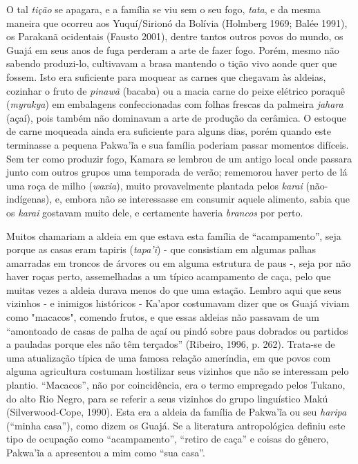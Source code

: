 O tal \emph{tição} se apagara, e a família se viu sem o seu fogo,
\emph{tata}, e da mesma maneira que ocorreu aos Yuquí/Sirionó da Bolívia
(Holmberg 1969; Balée 1991), os Parakanã ocidentais (Fausto 2001),
dentre tantos outros povos do mundo, os Guajá em seus anos de fuga
perderam a arte de fazer fogo. Porém, mesmo não sabendo produzi-lo,
cultivavam a brasa mantendo o tição vivo aonde quer que fossem. Isto era
suficiente para moquear as carnes que chegavam às aldeias, cozinhar o
fruto de \emph{pinawã} (bacaba) ou a macia carne do peixe elétrico
poraquê (\emph{myrakya}) em embalagens confeccionadas com folhas frescas
da palmeira \emph{jahara} (açaí), pois também não dominavam a arte de
produção da cerâmica. O estoque de carne moqueada ainda era suficiente
para alguns dias, porém quando este terminasse a pequena Pakwa'ĩa e sua
família poderiam passar momentos difíceis. Sem ter como produzir fogo,
Kamara se lembrou de um antigo local onde passara junto com outros
grupos uma temporada de verão; rememorou haver perto de lá uma roça de
milho (\emph{waxia}), muito provavelmente plantada pelos \emph{karai}
(não-indígenas), e, embora não se interessasse em consumir aquele
alimento, sabia que os \emph{karai} gostavam muito dele, e certamente
haveria \emph{brancos} por perto.

Muitos chamariam a aldeia em que estava esta família de ``acampamento'',
seja porque as casas eram tapiris (\emph{tapa'ĩ}) - que consistiam em
algumas palhas amarradas em troncos de árvores ou em alguma estrutura de
paus -, seja por não haver roças perto, assemelhadas a um típico
acampamento de caça, pelo que muitas vezes a aldeia durava menos do que
uma estação. Lembro aqui que seus vizinhos - e inimigos históricos -
Ka'apor costumavam dizer que os Guajá viviam como "macacos", comendo
frutos, e que essas aldeias não passavam de um ``amontoado de casas de
palha de açaí ou pindó sobre paus dobrados ou partidos a pauladas porque
eles não têm terçados'' (Ribeiro, 1996, p. 262). Trata-se de uma
atualização típica de uma famosa relação ameríndia, em que povos com
alguma agricultura costumam hostilizar seus vizinhos que não se
interessam pelo plantio. ``Macacos'', não por coincidência, era o termo
empregado pelos Tukano, do alto Rio Negro, para se referir a seus
vizinhos do grupo linguístico Makú (Silverwood-Cope, 1990). Esta era a
aldeia da família de Pakwa'ĩa ou seu \emph{haripa} (``minha casa''),
como dizem os Guajá. Se a literatura antropológica definiu este tipo de
ocupação como ``acampamento'', ``retiro de caça'' e coisas do gênero,
Pakwa'ĩa a apresentou a mim como ``sua casa''.

